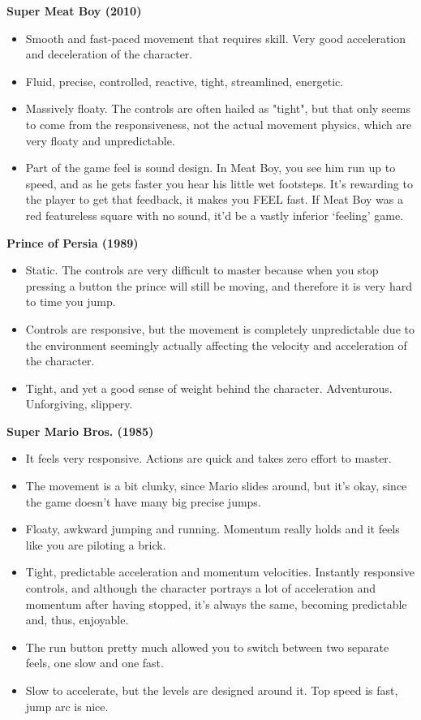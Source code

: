 \textbf{Super Meat Boy (2010)}
\vspace{-5mm}
\begin{itemize}[noitemsep,nolistsep]
\item Smooth and fast-paced movement that requires skill. Very good acceleration and deceleration of the character. 
\item Fluid, precise, controlled, reactive, tight, streamlined, energetic.
\item Massively floaty. The controls are often hailed as "tight", but that only seems to come from the responsiveness, not the actual movement physics, which are very floaty and unpredictable.
\item Part of the game feel is sound design. In Meat Boy, you see him run up to speed, and as he gets faster you hear his little wet footsteps. It's rewarding to the player to get that feedback, it makes you FEEL fast. If Meat Boy was a red featureless square with no sound, it'd be a vastly inferior `feeling' game.
\end{itemize}

\textbf{Prince of Persia (1989)}
\vspace{-5mm}
\begin{itemize}[noitemsep,nolistsep]
\item Static. The controls are very difficult to master because when you stop pressing a button the prince will still be moving, and therefore it is very hard to time you jump.
\item Controls are responsive, but the movement is completely unpredictable due to the environment seemingly actually affecting the velocity and acceleration of the character.
\item Tight, and yet a good sense of weight behind the character. Adventurous. Unforgiving, slippery.
\end{itemize}

\textbf{Super Mario Bros. (1985)}
\vspace{-5mm}
\begin{itemize}[noitemsep,nolistsep]
\item It feels very responsive. Actions are quick and takes zero effort to master.
\item The movement is a bit clunky, since Mario slides around, but it's okay, since the game doesn't have many big precise jumps.
\item Floaty, awkward jumping and running. Momentum really holds and it feels like you are piloting a brick.
\item Tight, predictable acceleration and momentum velocities. Instantly responsive controls, and although the character portrays a lot of acceleration and momentum after having stopped, it's always the same, becoming predictable and, thus, enjoyable.
\item The run button pretty much allowed you to switch between two separate feels, one slow and one fast.
\item Slow to accelerate, but the levels are designed around it. Top speed is fast, jump arc is nice.
\end{itemize}

